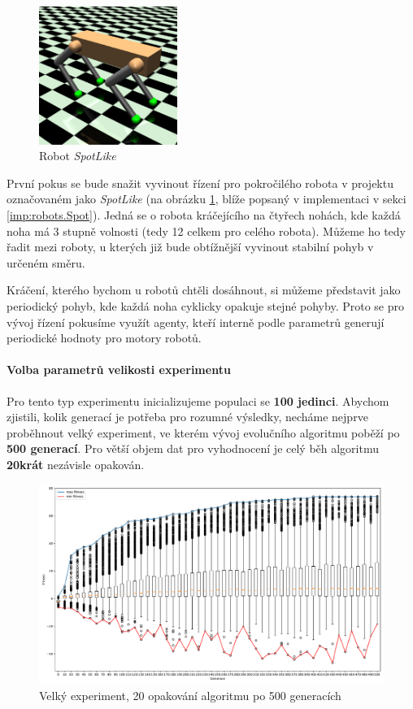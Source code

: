 \begin{figure}[!htb]
    \centering
    \includegraphics[width=0.4\textwidth]{../img/crop_SpotLike.jpg}
    \caption{Robot \emph{SpotLike}}
    \label{fig:robot:spotlike}
\end{figure}

První pokus se bude snažit vyvinout řízení pro pokročilého robota v projektu
označovaném jako \emph{SpotLike} (na obrázku \ref{fig:robot:spotlike}, blíže
popsaný v implementaci v sekci \ref{imp:robots.Spot}). Jedná se o robota
kráčejícího na čtyřech nohách, kde každá noha má 3 stupně volnosti (tedy 12
celkem pro celého robota). Můžeme ho tedy řadit mezi roboty, u kterých již bude
obtížnější vyvinout stabilní pohyb v určeném směru.

Kráčení, kterého bychom u robotů chtěli dosáhnout, si můžeme představit jako
periodický pohyb, kde každá noha cyklicky opakuje stejné pohyby. Proto se pro
vývoj řízení pokusíme využít agenty, kteří interně podle parametrů generují
periodické hodnoty pro motory robotů. 


\paragraph{Volba parametrů velikosti experimentu}
Pro tento typ experimentu inicializujeme populaci se \textbf{100 jedinci}.
Abychom zjistili, kolik generací je potřeba pro rozumné výsledky, necháme
nejprve proběhnout velký experiment, ve kterém vývoj evolučního algoritmu
poběží po \textbf{500 generací}. Pro větší objem dat pro vyhodnocení je celý
běh algoritmu \textbf{20krát} nezávisle opakován.

\begin{figure}[!htb]
    \centering
    \includegraphics[width=1\textwidth]{../img/BIGexperiment1_TFS_10ticks.pdf}
    \caption{Velký experiment, 20 opakování algoritmu po 500 generacích}
    \label{fig:exp_big}
\end{figure}

